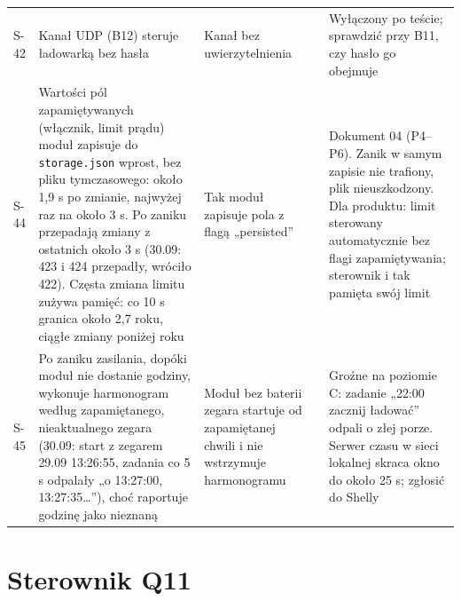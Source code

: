 \documentclass[11pt,a4paper]{article}
\begin{document}
\begin{longtable}{>{\raggedright\arraybackslash}p{3.00cm}>{\raggedright\arraybackslash}p{3.81cm}>{\raggedright\arraybackslash}p{2.97cm}>{\raggedright\arraybackslash}p{0.81cm}>{\raggedright\arraybackslash}p{3.81cm}}
S-42 & Kanał UDP (B12) steruje ładowarką bez hasła & Kanał bez uwierzytelnienia & \leavevmode{\symbolfont\color{apamber}\textbf{◐}} & Wyłączony po teście; sprawdzić przy B11, czy hasło go obejmuje \\
S-44 & Wartości pól zapamiętywanych (włącznik, limit prądu) moduł zapisuje do \texttt{storage.json} wprost, bez pliku tymczasowego: około 1,9 s po zmianie, najwyżej raz na około 3 s. Po zaniku przepadają zmiany z ostatnich około 3 s (30.09: 423 i 424 przepadły, wróciło 422). Częsta zmiana limitu zużywa pamięć: co 10 s granica około 2,7 roku, ciągłe zmiany poniżej roku & Tak moduł zapisuje pola z flagą „persisted” & \leavevmode{\symbolfont\color{apred}\textbf{✘}} & Dokument 04 (P4–P6). Zanik w samym zapisie nie trafiony, plik nieuszkodzony. Dla produktu: limit sterowany automatycznie bez flagi zapamiętywania; sterownik i tak pamięta swój limit \\
S-45 & Po zaniku zasilania, dopóki moduł nie dostanie godziny, wykonuje harmonogram według zapamiętanego, nieaktualnego zegara (30.09: start z zegarem 29.09 13:26:55, zadania co 5 s odpalały „o 13:27:00, 13:27:35…”), choć raportuje godzinę jako nieznaną & Moduł bez baterii zegara startuje od zapamiętanej chwili i nie wstrzymuje harmonogramu & \leavevmode{\symbolfont\color{apred}\textbf{✘}} & Groźne na poziomie C: zadanie „22:00 zacznij ładować” odpali o złej porze. Serwer czasu w sieci lokalnej skraca okno do około 25 s; zgłosić do Shelly \\
\end{longtable}

\section*{Sterownik Q11}
\end{document}
